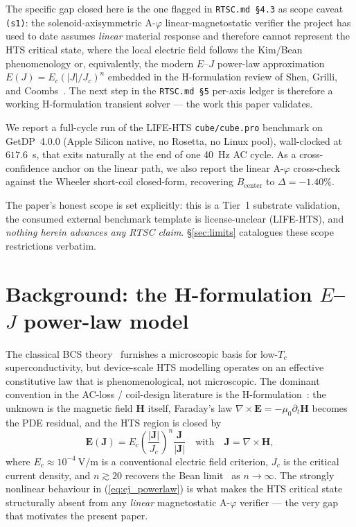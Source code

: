 \documentclass[11pt,a4paper]{article}
\begin{document}
The specific gap closed here is the one flagged in
\texttt{RTSC.md \S4.3} as scope caveat \texttt{(s1)}: the
solenoid-axisymmetric A-$\varphi$ linear-magnetostatic
verifier the project has used to date assumes \emph{linear} material
response and therefore cannot represent the HTS critical state, where
the local electric field follows the Kim/Bean phenomenology
\cite{kim1962,bean1962} or, equivalently, the modern $E$--$J$
power-law approximation $E(J) = E_c (|J|/J_c)^n$ embedded in the
H-formulation review of Shen, Grilli, and
Coombs~\cite{h_formulation_review}. The next step in the
\texttt{RTSC.md \S5} per-axis ledger is therefore a working
H-formulation transient solver --- the work this paper validates.

We report a full-cycle run of the LIFE-HTS \texttt{cube/cube.pro}
benchmark on GetDP~4.0.0 (Apple Silicon native, no Rosetta, no Linux
pool), wall-clocked at $617.6$~s, that exits naturally at the end
of one 40~Hz AC cycle. As a cross-confidence anchor on the linear
path, we also report the linear A-$\varphi$ cross-check against the
Wheeler short-coil closed-form\cite{wheeler1942}, recovering
$B_{\mathrm{center}}$ to $\Delta = -1.40\%$.

The paper's honest scope is set explicitly: this is a Tier~1 substrate
validation, the consumed external benchmark template is
license-unclear (LIFE-HTS), and \emph{nothing herein advances any
RTSC claim}. \S\ref{sec:limits} catalogues these scope restrictions
verbatim.

\section{Background: the H-formulation $E$--$J$ power-law model}
\label{sec:background}

The classical BCS theory~\cite{bcs1957} furnishes a microscopic
basis for low-$T_c$ superconductivity, but device-scale HTS modelling
operates on an effective constitutive law that is phenomenological,
not microscopic. The dominant convention in the AC-loss / coil-design
literature is the H-formulation~\cite{h_formulation_review}: the
unknown is the magnetic field $\mathbf{H}$ itself, Faraday's law
$\nabla \times \mathbf{E} = -\mu_0 \partial_t \mathbf{H}$ becomes the
PDE residual, and the HTS region is closed by
%
\begin{equation}
  \mathbf{E}(\mathbf{J})
   = E_c \left( \frac{|\mathbf{J}|}{J_c} \right)^{\!n}
     \frac{\mathbf{J}}{|\mathbf{J}|}
   \quad\text{with}\quad
  \mathbf{J} = \nabla \times \mathbf{H},
  \label{eq:ej_powerlaw}
\end{equation}
%
where $E_c \approx 10^{-4}~\mathrm{V/m}$ is a conventional electric
field criterion, $J_c$ is the critical current density, and $n
\gtrsim 20$ recovers the Bean limit~\cite{bean1962} as
$n \to \infty$. The strongly nonlinear behaviour in (\ref{eq:ej_powerlaw})
is what makes the HTS critical state structurally absent from any
\emph{linear} magnetostatic A-$\varphi$ verifier --- the very gap that
motivates the present paper.
\end{document}
